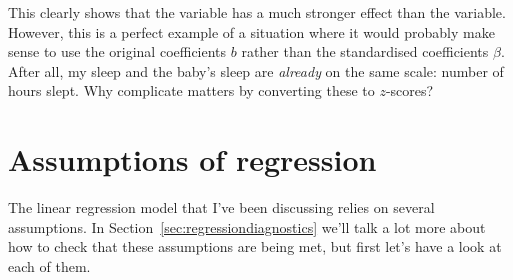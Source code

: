 This clearly shows that the  variable has a much stronger effect than the  variable. However, this is a perfect example of a situation where it would probably make sense to use the original coefficients $b$ rather than the standardised coefficients $\beta$. After all, my sleep and the baby's sleep are {\it already} on the same scale: number of hours slept. Why complicate matters by converting these to $z$-scores?


\section{Assumptions of regression~\label{sec:regressionassumptions}}

The linear regression model that I've been discussing relies on several assumptions. In Section~\ref{sec:regressiondiagnostics} we'll talk a lot more about how to check that these assumptions are being met, but first let's have a look at each of them.

